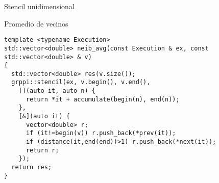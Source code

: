 \begin{frame}[t,fragile]{Stencil unidimensional}
\begin{block}{Promedio de vecinos}
\begin{lstlisting}
template <typename Execution>
std::vector<double> neib_avg(const Execution & ex, const std::vector<double> & v)
{
  std::vector<double> res(v.size());
  grppi::stencil(ex, v.begin(), v.end(), 
    [](auto it, auto n) {
      return *it + accumulate(begin(n), end(n)); 
    },
    [&](auto it) {
      vector<double> r;
      if (it!=begin(v)) r.push_back(*prev(it));
      if (distance(it,end(end))>1) r.push_back(*next(it));
      return r;
    });
  return res;
}
\end{lstlisting}
\end{block}
\end{frame}

